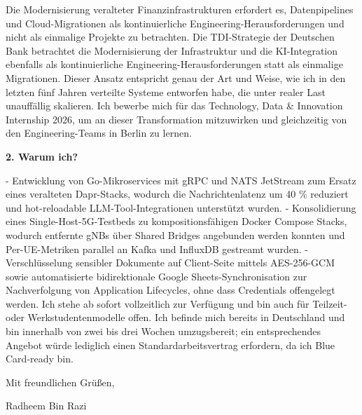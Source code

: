 \documentclass[11pt,a4paper]{coverletter}
\begin{document}
Die Modernisierung veralteter Finanzinfrastrukturen erfordert es, Datenpipelines und Cloud-Migrationen als kontinuierliche Engineering-Herausforderungen und nicht als einmalige Projekte zu betrachten. Die TDI-Strategie der Deutschen Bank betrachtet die Modernisierung der Infrastruktur und die KI-Integration ebenfalls als kontinuierliche Engineering-Herausforderungen statt als einmalige Migrationen. Dieser Ansatz entspricht genau der Art und Weise, wie ich in den letzten fünf Jahren verteilte Systeme entworfen habe, die unter realer Last unauffällig skalieren. Ich bewerbe mich für das Technology, Data \& Innovation Internship 2026, um an dieser Transformation mitzuwirken und gleichzeitig von den Engineering-Teams in Berlin zu lernen.

\vspace{8pt}\noindent\textbf{2. Warum ich?}\par\vspace{3pt}

- Entwicklung von Go-Mikroservices mit gRPC und NATS JetStream zum Ersatz eines veralteten Dapr-Stacks, wodurch die Nachrichtenlatenz um 40 \% reduziert und hot-reloadable LLM-Tool-Integrationen unterstützt wurden. - Konsolidierung eines Single-Host-5G-Testbeds zu kompositionsfähigen Docker Compose Stacks, wodurch entfernte gNBs über Shared Bridges angebunden werden konnten und Per-UE-Metriken parallel an Kafka und InfluxDB gestreamt wurden. - Verschlüsselung sensibler Dokumente auf Client-Seite mittels AES-256-GCM sowie automatisierte bidirektionale Google Sheets-Synchronisation zur Nachverfolgung von Application Lifecycles, ohne dass Credentials offengelegt werden. Ich stehe ab sofort vollzeitlich zur Verfügung und bin auch für Teilzeit- oder Werkstudentenmodelle offen. Ich befinde mich bereits in Deutschland und bin innerhalb von zwei bis drei Wochen umzugsbereit; ein entsprechendes Angebot würde lediglich einen Standardarbeitsvertrag erfordern, da ich Blue Card-ready bin.

\closing{Mit freundlichen Grüßen,}{Radheem Bin Razi}
\end{document}
